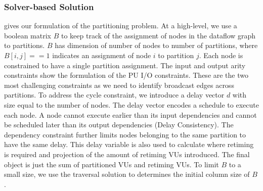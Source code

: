 \subsubsection{Solver-based Solution}
 gives our formulation of the partitioning problem.
At a high-level, we use a boolean matrix $B$ to keep track of the assignment of nodes in the dataflow graph to partitions. 
$B$ has dimension of number of nodes to number of partitions, where$B[i,j]==1$ indicates an assignment of node $i$ to partition $j$. 
Each node is constrained to have a single partition assignment.
The input and output arity constraints show the formulation of the PU I/O constraints.
These are the two most challenging constraints as we need to identify broadcast edges across partitions.
To address the cycle constraint, we introduce a delay vector $d$ with size equal to the number of nodes. 
The delay vector encodes a schedule to execute each node. 
A node cannot execute earlier than its input dependencies and cannot be scheduled later than its output dependencies (Delay Consistency).
The dependency constraint further limits nodes belonging to the same partition to have the same delay.
This delay variable is also used to calculate where retiming is required and projection of the amount of retiming VUs introduced. 
The final object is just the sum of partitioned VUs and retiming VUs.
To limit $B$ to a small size, we use the traversal solution to determines the initial column size of $B$.



